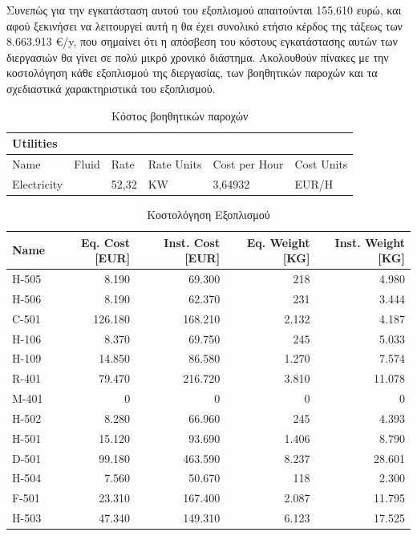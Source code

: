 \documentclass[11pt]{article}
\begin{document}
Συνεπώς για την εγκατάσταση αυτού του εξοπλισμού απαιτούνται 155.610
ευρώ, και αφού ξεκινήσει να λειτουργεί αυτή η θα έχει συνολικό ετήσιο
κέρδος της τάξεως των 8.663.913 €/y, που σημαίνει ότι η απόσβεση του
κόστους εγκατάστασης αυτών των διεργασιών θα γίνει σε πολύ μικρό χρονικό
διάστημα. Ακολουθούν πίνακες με την κοστολόγηση κάθε εξοπλισμού της
διεργασίας, των βοηθητικών παροχών και τα σχεδιαστικά χαρακτηριστικά του
εξοπλισμού.

\begin{table}[htbp]
\caption{Κόστος βοηθητικών παροχών}
\centering
\begin{tabular}{llllll}
Utilities &  &  &  &  & \\
\hline
Name & Fluid & Rate & Rate Units & Cost per Hour & Cost Units\\
Electricity &   & 52,32 & KW & 3,64932 & EUR/H\\
\end{tabular}
\end{table}

\begin{table}[htbp]
\caption{Κοστολόγηση Εξοπλισμού}
\centering
\begin{tabular}{lrrrr}
Name & Eq. Cost [EUR] & Inst. Cost [EUR] & Eq. Weight [KG] & Inst. Weight [KG]\\
\hline
H-505 & 8.190 & 69.300 & 218 & 4.980\\
H-506 & 8.190 & 62.370 & 231 & 3.444\\
C-501 & 126.180 & 168.210 & 2.132 & 4.187\\
H-106 & 8.370 & 69.750 & 245 & 5.033\\
H-109 & 14.850 & 86.580 & 1.270 & 7.574\\
R-401 & 79.470 & 216.720 & 3.810 & 11.078\\
M-401 & 0 & 0 & 0 & 0\\
H-502 & 8.280 & 66.960 & 245 & 4.393\\
H-501 & 15.120 & 93.690 & 1.406 & 8.790\\
D-501 & 99.180 & 463.590 & 8.237 & 28.601\\
H-504 & 7.560 & 50.670 & 118 & 2.300\\
F-501 & 23.310 & 167.400 & 2.087 & 11.795\\
H-503 & 47.340 & 149.310 & 6.123 & 17.525\\
\end{tabular}
\end{table}
\end{document}

